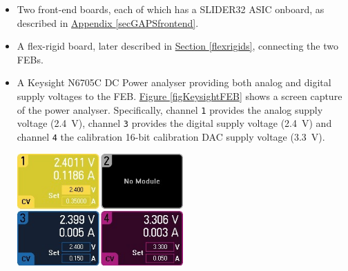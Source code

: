 \begin{itemize}
    \itemsep0em 
    \item Two front-end boards, each of which has a SLIDER32 ASIC onboard, as described in \hyperref[secGAPSfrontend]{Appendix \ref{secGAPSfrontend}}.
    \item A flex-rigid board, later described in \hyperref[flexrigids]{Section \ref{flexrigids}}, connecting the two FEBs.
    \item A Keysight N6705C DC Power analyser providing both analog and digital supply voltages to the FEB. \hyperref[figKeysightFEB]{Figure \ref{figKeysightFEB}} shows a screen capture of the power analyser. Specifically, channel \texttt{1} provides the analog supply voltage (\SI{2.4}{\volt}), channel \texttt{3} provides the digital supply voltage (\SI{2.4}{\volt}) and channel \texttt{4} the calibration 16-bit calibration DAC supply voltage (\SI{3.3}{\volt}).
    
        \begin{minipage}{\linewidth}
        \vspace{0.4cm}
            \centering
            \includegraphics[width=0.5\textwidth]{Images/chap2/power_supply_screen.jpg}
            \label{figKeysightFEB}
            \vspace{0.4cm}
        \end{minipage}
    

\end{itemize}
